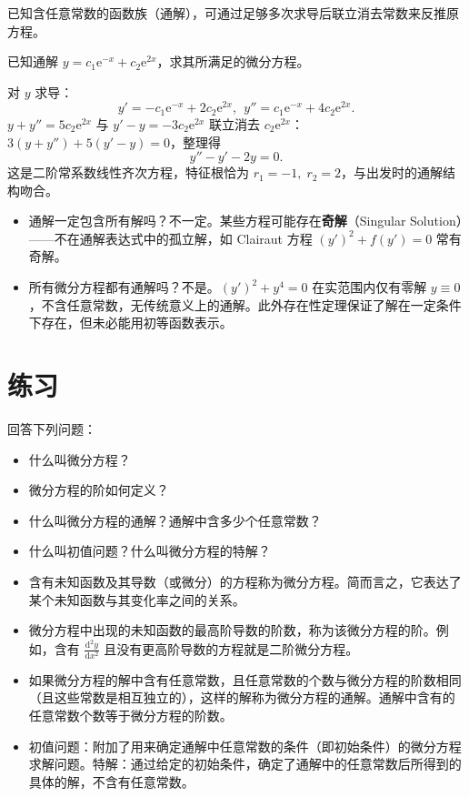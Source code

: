 \documentclass[lang=cn,11pt]{elegantbook}
\begin{document}
已知含任意常数的函数族（通解），可通过足够多次求导后联立消去常数来反推原方程。

\begin{exercise}
已知通解 $y=c_1\mathrm{e}^{-x}+c_2\mathrm{e}^{2x}$，求其所满足的微分方程。
\end{exercise}

\begin{solution}
对 $y$ 求导：
\[
y'=-c_1\mathrm{e}^{-x}+2c_2\mathrm{e}^{2x},~~
y''=c_1\mathrm{e}^{-x}+4c_2\mathrm{e}^{2x}.
\]
$y+y''=5c_2\mathrm{e}^{2x}$ 与 $y'-y=-3c_2\mathrm{e}^{2x}$ 联立消去 $c_2\mathrm{e}^{2x}$：$3(y+y'')+5(y'-y)=0$，整理得
\[
\boxed{y''-y'-2y=0}.
\]
这是二阶常系数线性齐次方程，特征根恰为 $r_1=-1,\; r_2=2$，与出发时的通解结构吻合。
\end{solution}

\begin{note}
\begin{itemize}
\item  通解一定包含所有解吗？不一定。某些方程可能存在\textbf{奇解}（Singular Solution）——不在通解表达式中的孤立解，如 Clairaut 方程 $(y')^2+f(y')=0$ 常有奇解。
\item  所有微分方程都有通解吗？不是。$(y')^2+y^4=0$ 在实范围内仅有零解 $y\equiv 0$，不含任意常数，无传统意义上的通解。此外存在性定理保证了解在一定条件下存在，但未必能用初等函数表示。
\end{itemize}
\end{note}

\section{练习}

\begin{exercise}[相关概念]
回答下列问题：
\begin{itemize}
\item 什么叫微分方程？
\item 微分方程的阶如何定义？
\item 什么叫微分方程的通解？通解中含多少个任意常数？
\item 什么叫初值问题？什么叫微分方程的特解？
\end{itemize}
\end{exercise}
\begin{solution}
\begin{itemize}
    \item 含有未知函数及其导数（或微分）的方程称为微分方程。简而言之，它表达了某个未知函数与其变化率之间的关系。
    \item 微分方程中出现的未知函数的最高阶导数的阶数，称为该微分方程的阶。例如，含有 $\frac{\mathrm{d}^2y}{\mathrm{d}x^2}$ 且没有更高阶导数的方程就是二阶微分方程。
    \item 如果微分方程的解中含有任意常数，且任意常数的个数与微分方程的阶数相同（且这些常数是相互独立的），这样的解称为微分方程的通解。通解中含有的任意常数个数等于微分方程的阶数。
    \item 初值问题：附加了用来确定通解中任意常数的条件（即初始条件）的微分方程求解问题。特解：通过给定的初始条件，确定了通解中的任意常数后所得到的具体的解，不含有任意常数。
\end{itemize}
\end{solution}
\end{document}
